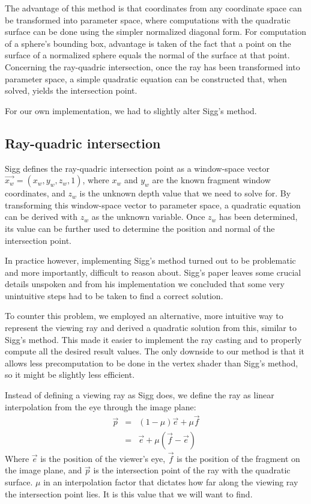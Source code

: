 The advantage of this method is that coordinates from any coordinate space can be transformed into parameter space, where computations
with the quadratic surface can be done using the simpler normalized diagonal form. 
For computation of a sphere's bounding box, advantage is taken of the fact that a point on the surface of a normalized sphere equals
the normal of the surface at that point.
Concerning the ray-quadric intersection, once the ray has been transformed into parameter space, a simple quadratic equation can be constructed
that, when solved, yields the intersection point.

For our own implementation, we had to slightly alter Sigg's method.

\subsection*{Ray-quadric intersection}
Sigg defines the ray-quadric intersection point as a window-space vector $\vec{x_w} = ( x_w, y_w, z_w, 1 )$, where $x_w$ and $y_w$ are the known 
fragment window coordinates, and $z_w$ is the unknown depth value that we need to solve for.
By transforming this window-space vector to parameter space, a quadratic equation can be derived with $z_w$ as the unknown variable.
Once $z_w$ has been determined, its value can be further used to determine the position and normal of the intersection point.

In practice however, implementing Sigg's method turned out to be problematic and more importantly, difficult to reason about.
Sigg's paper leaves some crucial details unspoken and from his implementation we concluded that some very unintuitive
steps had to be taken to find a correct solution.

To counter this problem, we employed an alternative, more intuitive way to represent the viewing ray and derived a quadratic solution from this,
similar to Sigg's method. This made it easier to implement the ray casting and to properly compute all the desired result values. The only downside
to our method is that it allows less precomputation to be done in the vertex shader than Sigg's method, so it might be slightly less efficient.

Instead of defining a viewing ray as Sigg does, we define the ray as linear interpolation from the eye through the image plane:
\begin{eqnarray*}
\vec{p} & = & (1 - \mu)\vec{e} + \mu \vec{f}\\
	& = & \vec{e} + \mu(\vec{f}-\vec{e})
\end{eqnarray*}
Where $\vec{e}$ is the position of the viewer's eye, $\vec{f}$ is the position of the fragment on the image plane, 
and $\vec{p}$ is the intersection point of the ray with the quadratic surface. 
$\mu$ in an interpolation factor that dictates how far along the viewing ray the intersection point lies. It is this value that we will want to find.

